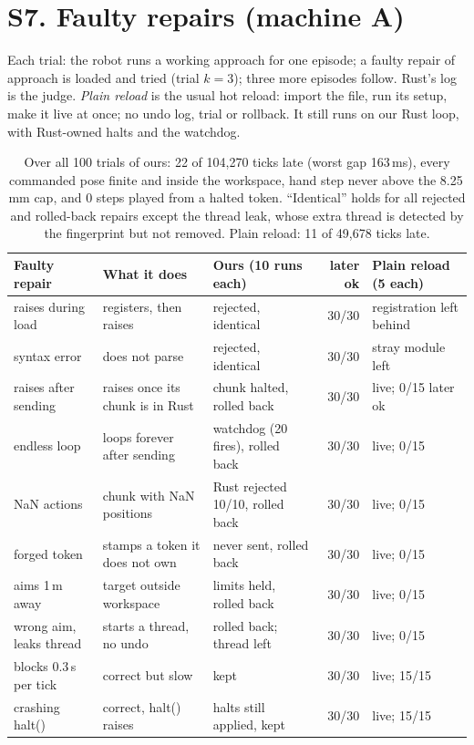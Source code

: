 \documentclass[10pt,letterpaper]{article}
\newcommand{\ms}{\,ms}
\begin{document}
\section*{S7. Faulty repairs (machine A)}
Each trial: the robot runs a working approach for one episode; a faulty repair of approach is loaded and tried (trial $k{=}3$); three more episodes follow. Rust's log is the judge. \emph{Plain reload} is the usual hot reload: import the file, run its setup, make it live at once; no undo log, trial or rollback. It still runs on our Rust loop, with Rust-owned halts and the watchdog.

\begin{table}[h]
\centering\small
\begin{tabular}{lllrl}
\toprule
Faulty repair & What it does & Ours (10 runs each) & later ok & Plain reload (5 each)\\
\midrule
raises during load & registers, then raises & rejected, identical & 30/30 & registration left behind\\
syntax error & does not parse & rejected, identical & 30/30 & stray module left\\
raises after sending & raises once its chunk is in Rust & chunk halted, rolled back & 30/30 & live; 0/15 later ok\\
endless loop & loops forever after sending & watchdog (20 fires), rolled back & 30/30 & live; 0/15\\
NaN actions & chunk with NaN positions & Rust rejected 10/10, rolled back & 30/30 & live; 0/15\\
forged token & stamps a token it does not own & never sent, rolled back & 30/30 & live; 0/15\\
aims 1\,m away & target outside workspace & limits held, rolled back & 30/30 & live; 0/15\\
wrong aim, leaks thread & starts a thread, no undo & rolled back; thread left & 30/30 & live; 0/15\\
blocks 0.3\,s per tick & correct but slow & kept & 30/30 & live; 15/15\\
crashing halt() & correct, halt() raises & halts still applied, kept & 30/30 & live; 15/15\\
\bottomrule
\end{tabular}
\caption{Over all 100 trials of ours: 22 of 104{,}270 ticks late (worst gap 163\ms), every commanded pose finite and inside the workspace, hand step never above the 8.25\,mm cap, and 0 steps played from a halted token. ``Identical'' holds for all rejected and rolled-back repairs except the thread leak, whose extra thread is detected by the fingerprint but not removed. Plain reload: 11 of 49{,}678 ticks late.}
\end{table}
\end{document}
